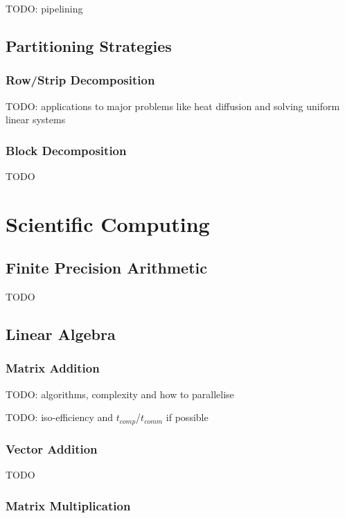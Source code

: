 \documentclass{article}
\begin{document}
TODO: pipelining

\subsection{Partitioning Strategies}

\subsubsection{Row/Strip Decomposition}

TODO: applications to major problems like heat diffusion and solving uniform linear systems

\subsubsection{Block Decomposition}

TODO

\section{Scientific Computing}

\subsection{Finite Precision Arithmetic}

TODO

\subsection{Linear Algebra}

\subsubsection{Matrix Addition}

TODO: algorithms, complexity and how to parallelise

TODO: iso-efficiency and $t_{comp}$/$t_{comm}$ if possible

\subsubsection{Vector Addition}

TODO

\subsubsection{Matrix Multiplication}
\end{document}

